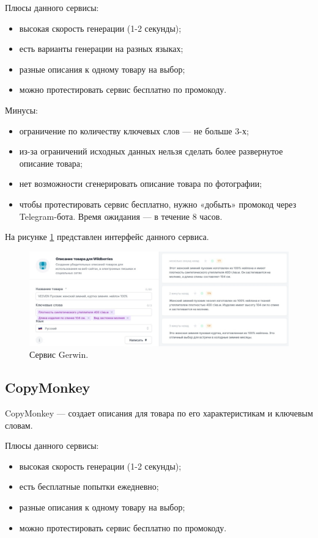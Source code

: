\documentclass[a4paper,12pt]{extarticle}
\begin{document}
Плюсы данного сервисы:
\begin{itemize}
	\item высокая скорость генерации (1-2 секунды);
	\item есть варианты генерации на разных языках;
	\item разные описания к одному товару на выбор;
	\item можно протестировать сервис бесплатно по промокоду.
\end{itemize}

Минусы:
\begin{itemize}
	\item ограничение по количеству ключевых слов — не больше 3-х;
	\item из-за ограничений исходных данных нельзя сделать более развернутое описание товара;
	\item нет возможности сгенерировать описание товара по фотографии;
	\item чтобы протестировать сервис бесплатно, нужно «добыть» промокод через Telegram-бота. Время ожидания — в течение 8 часов.
\end{itemize}

На рисунке \ref{fig:gerwin} представлен интерфейс данного сервиса.

\begin{figure}[ht]
	\centering
	\includegraphics[scale=0.15]{gerwin.png}
	\caption{Сервис Gerwin.}
	\label{fig:gerwin}
\end{figure}

\newpage
\subsection{CopyMonkey}

CopyMonkey — создает описания для товара по его характеристикам и ключевым словам.

Плюсы данного сервисы:
\begin{itemize}
	\item высокая скорость генерации (1-2 секунды);
	\item есть бесплатные попытки ежедневно;
	\item разные описания к одному товару на выбор;
	\item можно протестировать сервис бесплатно по промокоду.
\end{itemize}
\end{document}
